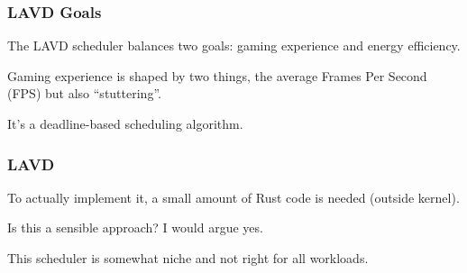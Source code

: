 \begin{frame}
\frametitle{LAVD Goals}

The LAVD scheduler balances two goals: gaming experience and energy efficiency. 

Gaming experience is shaped by two things, the average Frames Per Second (FPS) but also ``stuttering''. 

It's a deadline-based scheduling algorithm.

\end{frame}


\begin{frame}
\frametitle{LAVD}

To actually implement it, a small amount of Rust code is needed (outside kernel).

Is this a sensible approach? I would argue yes.

This scheduler is somewhat niche and not right for all workloads.

\end{frame}




